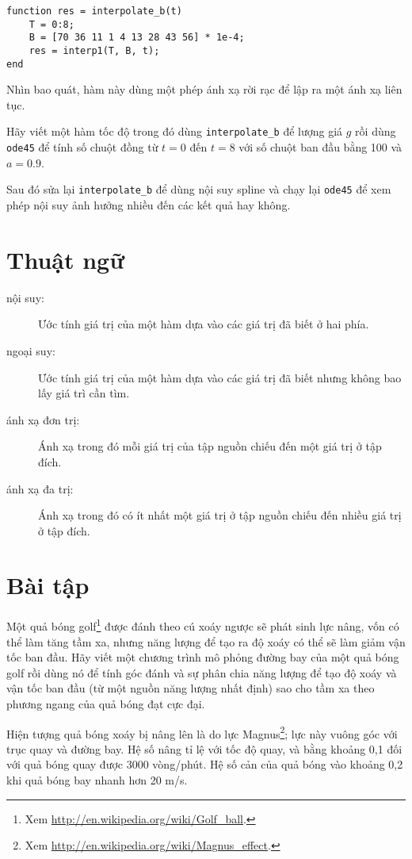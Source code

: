 \documentclass[12pt]{book}
\begin{document}
\begin{verbatim}
function res = interpolate_b(t)
    T = 0:8;
    B = [70 36 11 1 4 13 28 43 56] * 1e-4;
    res = interp1(T, B, t);
end
\end{verbatim}
%
Nhìn bao quát, hàm này dùng một phép ánh xạ rời rạc để lập ra một 
ánh xạ liên tục.

\begin{ex}
Hãy viết một hàm tốc độ trong đó dùng \verb#interpolate_b# để 
lượng giá  $g$ rồi dùng {\tt ode45} để tính số chuột đồng từ 
$t=0$ đến $t=8$ với số chuột ban đầu bằng 100 và $a=0.9$.

Sau đó sửa lại   \verb#interpolate_b# để dùng nội suy spline và 
chạy lại  {\tt ode45} để xem phép nội suy ảnh hưởng nhiều đến các kết 
quả hay không.
\end{ex}

\section{Thuật ngữ}

\begin{description}

\item[nội suy:] Ước tính giá trị của một hàm dựa vào các giá trị đã biết 
ở hai phía.

\item[ngoại suy:] Ước tính giá trị của một hàm dựa vào các giá trị đã biết 
nhưng không bao lấy giá trì cần tìm.

\item[ánh xạ đơn trị:] Ánh xạ trong đó mỗi giá trị của tập nguồn chiếu 
đến một giá trị ở tập đích.

\item[ánh xạ đa trị:] Ánh xạ trong đó có ít nhất một giá trị ở tập nguồn chiếu 
đến nhiều giá trị ở tập đích.

\end{description}


\section{Bài tập}

\begin{ex}
\label{golf}

Một quả bóng golf\footnote{Xem
\url{http://en.wikipedia.org/wiki/Golf_ball}.} được đánh theo cú xoáy ngược 
sẽ phát sinh lực nâng, vốn có thể làm tăng tầm xa, nhưng năng lượng để 
tạo ra độ xoáy có thể sẽ làm giảm vận tốc ban đầu. Hãy viết một chương trình 
mô phỏng đường bay của một quả bóng golf rồi dùng nó để tính góc đánh 
và sự phân chia năng lượng để tạo độ xoáy và vận tốc ban đầu (từ một 
nguồn năng lượng nhất định) sao cho tầm xa theo phương ngang của quả 
bóng đạt cực đại.

Hiện tượng quả bóng xoáy bị nâng lên là do lực Magnus\footnote{Xem 
\url{http://en.wikipedia.org/wiki/Magnus_effect}.}; lực này vuông góc với 
trục quay và đường bay. Hệ số nâng tỉ lệ với tốc độ quay, và bằng khoảng 
0,1 đối với quả bóng quay được 3000 vòng/phút. Hệ số cản của quả bóng 
vào khoảng 0,2 khi quả bóng bay nhanh hơn 20 m/s.
\end{ex}
\end{document}

